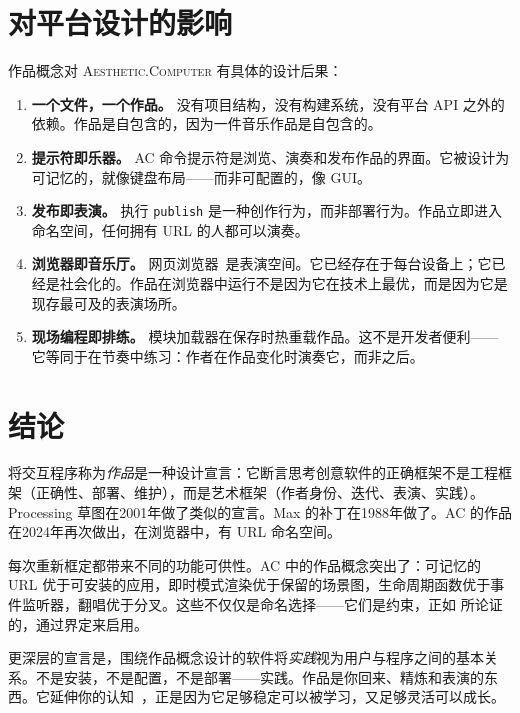 \documentclass[10pt,letterpaper,twocolumn]{article}
\newcommand{\ac}{\textsc{Aesthetic.Computer}}
\begin{document}
\section{对平台设计的影响}

作品概念对 \ac{} 有具体的设计后果：

\begin{enumerate}
  \item \textbf{一个文件，一个作品。} 没有项目结构，没有构建系统，没有平台 API 之外的依赖。作品是自包含的，因为一件音乐作品是自包含的。
  \item \textbf{提示符即乐器。} AC 命令提示符是浏览、演奏和发布作品的界面。它被设计为可记忆的，就像键盘布局——而非可配置的，像 GUI。
  \item \textbf{发布即表演。} 执行 \texttt{publish} 是一种创作行为，而非部署行为。作品立即进入命名空间，任何拥有 URL 的人都可以演奏。
  \item \textbf{浏览器即音乐厅。} 网页浏览器~\citep{wyse2013viability}是表演空间。它已经存在于每台设备上；它已经是社会化的。作品在浏览器中运行不是因为它在技术上最优，而是因为它是现存最可及的表演场所。
  \item \textbf{现场编程即排练。} 模块加载器在保存时热重载作品。这不是开发者便利——它等同于在节奏中练习：作者在作品变化时演奏它，而非之后。
\end{enumerate}

\section{结论}

将交互程序称为\emph{作品}是一种设计宣言：它断言思考创意软件的正确框架不是工程框架（正确性、部署、维护），而是艺术框架（作者身份、迭代、表演、实践）。Processing 草图在2001年做了类似的宣言。Max 的补丁在1988年做了。AC 的作品在2024年再次做出，在浏览器中，有 URL 命名空间。

每次重新框定都带来不同的功能可供性。AC 中的作品概念突出了：可记忆的 URL 优于可安装的应用，即时模式渲染优于保留的场景图，生命周期函数优于事件监听器，翻唱优于分叉。这些不仅仅是命名选择——它们是约束，正如 \citet{magnusson2010designing} 所论证的，通过界定来启用。

更深层的宣言是，围绕作品概念设计的软件将\emph{实践}视为用户与程序之间的基本关系。不是安装，不是配置，不是部署——实践。作品是你回来、精炼和表演的东西。它延伸你的认知~\citep{clark1998extended}，正是因为它足够稳定可以被学习，又足够灵活可以成长。



\end{document}
